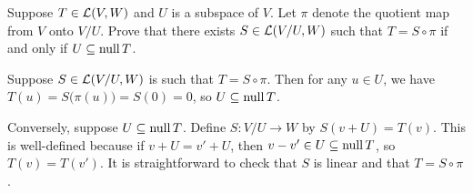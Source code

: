 \begin{exc}
\begin{exercise}
Suppose $T\in\mathcal{L}(V,W)$ and $U$ is a subspace of $V$. Let $\pi$ denote the
quotient map from $V$ onto $V/U$. Prove that there exists $S\in\mathcal{L}(V/U,W)$ such
that $T=S\circ\pi$ if and only if $U\subseteq\operatorname{null} T$.
\end{exercise}
\begin{solution}
Suppose $S\in\mathcal{L}(V/U,W)$ is such that $T=S\circ\pi$. Then for any $u\in U$, we
have $T(u)=S\bigl(\pi(u)\bigr)=S(0)=0$, so $U\subseteq\operatorname{null} T$.

Conversely, suppose $U\subseteq\operatorname{null} T$. Define $S\colon V/U\to W$ by
$S(v+U)=T(v)$. This is well-defined because if $v+U=v'+U$, then
$v-v'\in U\subseteq\operatorname{null} T$, so $T(v)=T(v')$. It is straightforward to check that
$S$ is linear and that $T=S\circ\pi$.
\end{solution}
\end{exc}
